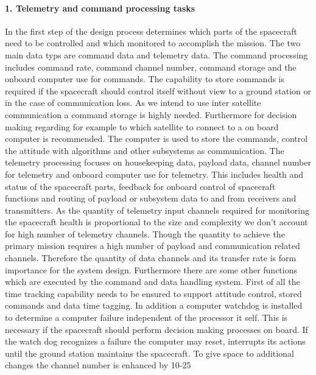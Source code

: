 \paragraph{1. Telemetry and command processing tasks}
In the first step of the design process determines which parts of the spacecraft need to be controlled and which monitored to accomplish the mission. The two main data typs are command data and telemetry data.
The command processing includes command rate, command channel number, command storage and the onboard computer use for commands. The capability to store commands is required if the spacecraft should control itself without view to a ground station or in the case of communication loss. As we intend to use inter satellite communication a command storage is highly needed. Furthermore for decision making regarding for example to which satellite to connect to a on board computer is recommended. The computer is used to store the commands, control the attitude with algorithms and other subsystems as communication.
The telemetry processing focuses on housekeeping data, payload data, channel number for telemetry and onboard computer use for telemetry. This includes health and status of the spacecraft parts, feedback for onboard control of spacecraft functions and routing of payload or subsystem data to and from receivers and transmitters. As the quantity of telemetry input channels required for monitoring the spacecraft health is proportional to the size and complexity we don’t account for high number of telemetry channels.
Though the quantity to achieve the primary mission requires a high number of payload and communication related channels. Therefore the quantity of data channels and its transfer rate is form importance for the system design.
Furthermore there are some other functions which are executed by the command and data handling system. First of all the time tracking capability needs to be ensured to support attitude control, stored commands and data time tagging. In addition a computer watchdog is installed to determine a computer failure independent of the processor it self. This is necessary if the spacecraft should perform decision making processes on board. If the watch dog recognizes a failure the computer may reset, interrupts its actions until the ground station maintains the spacecraft. To give space to additional changes the channel number is enhanced by 10-25%

